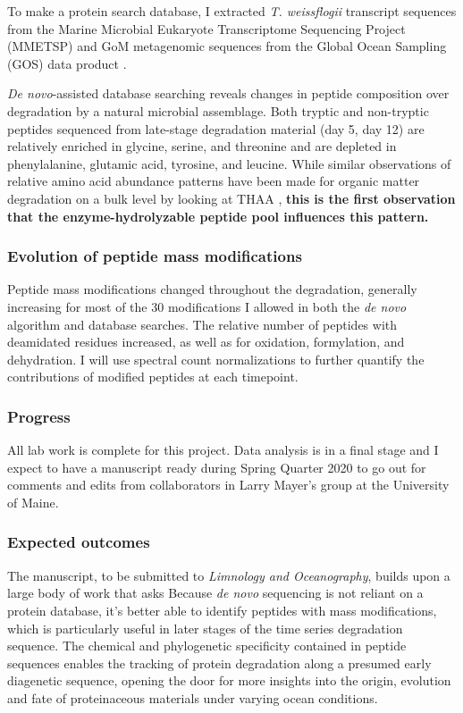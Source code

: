 \documentclass[12pt, letterpaper, twoside]{article}
\begin{document}
To make a protein search database, I extracted \textit{T. weissflogii} transcript sequences from the Marine Microbial Eukaryote Transcriptome Sequencing Project (MMETSP) \cite{keeling_marine_2014} and GoM metagenomic sequences from the Global Ocean Sampling (GOS) data product \cite{yooseph_sorcerer_2007}.
 
\textit{De novo}-assisted database searching reveals changes in peptide composition over degradation by a natural microbial assemblage. Both tryptic and non-tryptic peptides sequenced from late-stage degradation material (day 5, day 12) are relatively enriched in glycine, serine, and threonine and are depleted in phenylalanine, glutamic acid, tyrosine, and leucine. While similar observations of relative amino acid abundance patterns have been made for organic matter degradation on a bulk level by looking at THAA \cite{dauwe_linking_1999}, \textbf{this is the first observation that the enzyme-hydrolyzable peptide pool influences this pattern.} 

\subsubsection{Evolution of peptide mass modifications}

Peptide mass modifications changed throughout the degradation, generally increasing for most of the 30 modifications I allowed in both the \textit{de novo} algorithm and database searches. The relative number of peptides with deamidated residues increased, as well as for oxidation, formylation, and dehydration. I will use spectral count normalizations to further quantify the contributions of modified peptides at each timepoint. 

\subsubsection*{Progress}

All lab work is complete for this project. Data analysis is in a final stage and I expect to have a manuscript ready during Spring Quarter 2020 to go out for comments and edits from collaborators in Larry Mayer's group at the University of Maine.

\subsubsection*{Expected outcomes}

The manuscript, to be submitted to \textit{Limnology and Oceanography}, builds upon a large body of work that asks  Because \textit{de novo} sequencing is not reliant on a protein database, it's better able to identify peptides with mass modifications, which is particularly useful in later stages of the time series degradation sequence. The chemical and phylogenetic specificity contained in peptide sequences enables the tracking of protein degradation along a presumed early diagenetic sequence, opening the door for more insights into the origin, evolution and fate of proteinaceous materials under varying ocean conditions.
\end{document}
